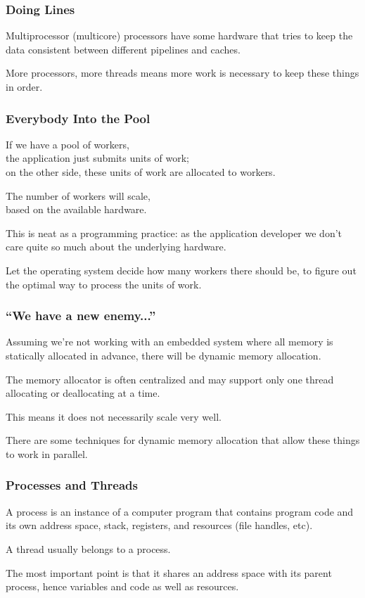 \begin{frame}
\frametitle{Doing Lines}

Multiprocessor (multicore) processors have some hardware that tries to keep the data consistent between different pipelines and caches.

 More processors, more threads means more work is necessary to keep these things in order.

\end{frame}



\begin{frame}
\frametitle{Everybody Into the Pool}
\begin{changemargin}{0cm}
If we have a pool of workers, \\
\quad the application just submits units of work;\\
\quad on the other side, these units of work are allocated to workers. 

The number of workers will scale,\\ based on the available hardware. 

This is neat as a programming practice: as the application developer we don't care quite so much about the underlying hardware. 

Let the operating system decide how many workers there should be, to figure out the optimal way to process the units of work.
\end{changemargin}

\end{frame}



\begin{frame}
\frametitle{``We have a new enemy...''}

Assuming we're not working with an embedded system where all memory is statically allocated in advance, there will be dynamic memory allocation. 

The memory allocator is often centralized and may support only one thread allocating or deallocating at a time. 

This means it does not necessarily scale very well.

There are some techniques for dynamic memory allocation that allow these things to work in parallel.


\end{frame}



\begin{frame}
\frametitle{Processes and Threads}
A \alert{process} is an
instance of a computer program that contains program code and its own
address space, stack, registers, and resources (file handles, etc).  

A
\alert{thread} usually belongs to a process. 

The most important point
is that it shares an address space with its parent process, hence
variables and code as well as resources.


\end{frame}




